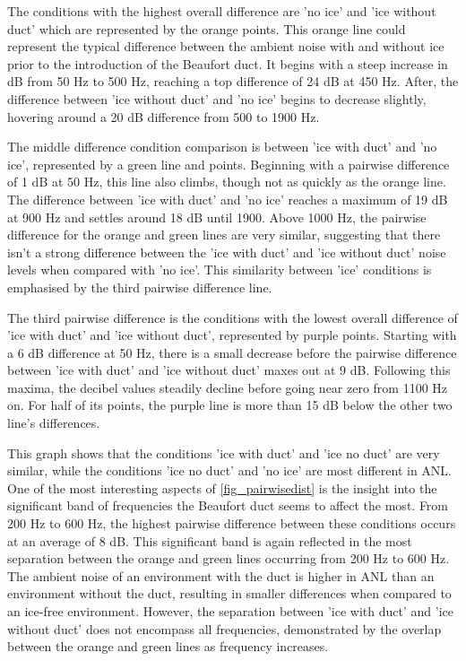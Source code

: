 The conditions with the highest overall difference are 'no ice' and 'ice without duct' which are represented by the orange points. This orange line could represent the typical difference between the ambient noise with and without ice prior to the introduction of the Beaufort duct. It begins with a steep increase in dB from 50 Hz to 500 Hz, reaching a top difference of 24 dB at 450 Hz. After, the difference between 'ice without duct' and 'no ice' begins to decrease slightly, hovering around a 20 dB difference from 500 to 1900 Hz.

The middle difference condition comparison is between 'ice with duct' and 'no ice', represented by a green line and points. Beginning with a pairwise difference of 1 dB at 50 Hz, this line also climbs, though not as quickly as the orange line. The difference between 'ice with duct' and 'no ice' reaches a maximum of 19 dB at 900 Hz and settles around 18 dB until 1900. Above 1000 Hz, the pairwise difference for the orange and green lines are very similar, suggesting that there isn't a strong difference between the 'ice with duct' and 'ice without duct' noise levels when compared with 'no ice'. This  similarity between 'ice' conditions is emphasised by the third pairwise difference line.

The third pairwise difference is the conditions with the lowest overall difference of 'ice with duct' and 'ice without duct', represented by purple points. Starting with a 6 dB difference at 50 Hz, there is a small decrease before the pairwise difference between 'ice with duct' and 'ice without duct' maxes out at 9 dB. Following this maxima, the decibel values steadily decline before going near zero from 1100 Hz on. For half of its points, the purple line is more than 15 dB below the other two line's differences.  

This graph shows that the conditions 'ice with duct' and 'ice no duct' are very similar, while the conditions 'ice no duct' and 'no ice' are most different in ANL. One of the most interesting aspects of \autoref{fig_pairwisedist} is the insight into the significant band of frequencies the Beaufort duct seems to affect the most. From 200 Hz to 600 Hz, the highest pairwise difference between these conditions occurs at an average of 8 dB. This significant band is again reflected in the most separation between the orange and green lines occurring from 200 Hz to 600 Hz. The ambient noise of an environment with the duct is higher in ANL than an environment without the duct, resulting in smaller differences when compared to an ice-free environment. However, the separation between 'ice with duct' and 'ice without duct' does not encompass all frequencies, demonstrated by the overlap between the orange and green lines as frequency increases.


